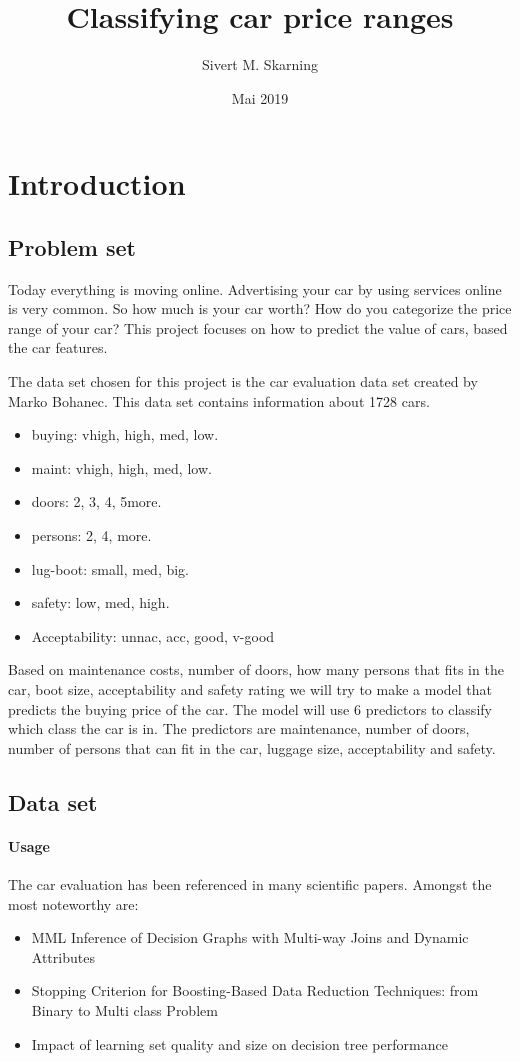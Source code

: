 \documentclass[a4paper, 12pt]{article}
\title{Classifying car price ranges}
\author{Sivert M. Skarning}
\date{Mai 2019}
\begin{document}
\maketitle
\clearpage
\tableofcontents
\clearpage

\section{Introduction}
\subsection{Problem set}
Today everything is moving online. Advertising your car by using services online is very common. So how much is your car worth? How do you categorize the price range of your car? This project focuses on how to predict the value of cars, based the car features.

The data set chosen for this project is the car evaluation data set created by Marko Bohanec. This data set contains information about 1728 cars.

\begin{itemize}
  \item buying: vhigh, high, med, low.
  \item maint: vhigh, high, med, low.
  \item doors: 2, 3, 4, 5more.
  \item persons: 2, 4, more.
  \item lug-boot: small, med, big.
  \item safety: low, med, high.
  \item Acceptability: unnac, acc, good, v-good
\end{itemize}

Based on maintenance costs, number of doors, how many persons that fits in the car, boot size, acceptability and safety rating we will try to make a model that predicts the buying price of the car. The model will use 6 predictors to classify which class the car is in. The predictors are maintenance, number of doors, number of persons that can fit in the car, luggage size, acceptability and safety.


\subsection{Data set}
\paragraph{Usage}
The car evaluation has been referenced in many scientific papers. Amongst the most noteworthy are:
\begin{itemize}
\item MML Inference of Decision Graphs with Multi-way Joins and Dynamic Attributes \cite{mml-interference}
\item Stopping Criterion for Boosting-Based Data Reduction Techniques: from Binary to Multi class Problem \cite{boosting}
\item Impact of learning set quality and size on decision tree performance \cite{learning-set}
\end{itemize}
\end{document}
